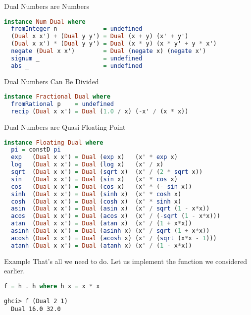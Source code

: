 \documentclass{beamer}
\begin{document}
\begin{frame}[fragile]{Dual Numbers are Numbers}
\begin{scriptsize}
\begin{lstlisting}[language=Haskell]
instance Num Dual where
  fromInteger n             = undefined
  (Dual x x') + (Dual y y') = Dual (x + y) (x' + y')
  (Dual x x') * (Dual y y') = Dual (x * y) (x * y' + y * x')
  negate (Dual x x')        = Dual (negate x) (negate x')
  signum _                  = undefined
  abs _                     = undefined
\end{lstlisting}
\end{scriptsize}
\end{frame}

\begin{frame}[fragile]{Dual Numbers Can Be Divided}
\begin{scriptsize}
\begin{lstlisting}[language=Haskell]
instance Fractional Dual where
  fromRational p    = undefined
  recip (Dual x x') = Dual (1.0 / x) (-x' / (x * x))
\end{lstlisting}
\end{scriptsize}
\end{frame}

\begin{frame}[fragile]{Dual Numbers are Quasi Floating Point}
\begin{scriptsize}
\begin{lstlisting}[language=Haskell]
instance Floating Dual where
  pi = constD pi
  exp   (Dual x x') = Dual (exp x)   (x' * exp x)
  log   (Dual x x') = Dual (log x)   (x' / x)
  sqrt  (Dual x x') = Dual (sqrt x)  (x' / (2 * sqrt x))
  sin   (Dual x x') = Dual (sin x)   (x' * cos x)
  cos   (Dual x x') = Dual (cos x)   (x' * (- sin x))
  sinh  (Dual x x') = Dual (sinh x)  (x' * cosh x)
  cosh  (Dual x x') = Dual (cosh x)  (x' * sinh x)
  asin  (Dual x x') = Dual (asin x)  (x' / sqrt (1 - x*x))
  acos  (Dual x x') = Dual (acos x)  (x' / (-sqrt (1 - x*x)))
  atan  (Dual x x') = Dual (atan x)  (x' / (1 + x*x))
  asinh (Dual x x') = Dual (asinh x) (x' / sqrt (1 + x*x))
  acosh (Dual x x') = Dual (acosh x) (x' / (sqrt (x*x - 1)))
  atanh (Dual x x') = Dual (atanh x) (x' / (1 - x*x))
\end{lstlisting}
\end{scriptsize}
\end{frame}


\begin{frame}[fragile]{Example}
That's all we need to do. Let us implement the function we considered
earlier.

\begin{scriptsize}
\begin{lstlisting}[language=Haskell]
f = h . h where h x = x * x
\end{lstlisting}
\end{scriptsize}

\begin{scriptsize}
\begin{lstlisting}
ghci> f (Dual 2 1)
  Dual 16.0 32.0
\end{lstlisting}
\end{scriptsize}
\end{frame}
\end{document}
